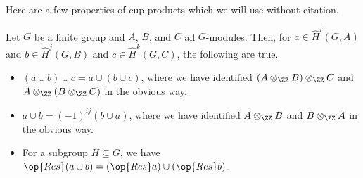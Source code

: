 Here are a few properties of cup products which we will use without citation.
\begin{proposition}
	Let $G$ be a finite group and $A$, $B$, and $C$ all $G$-modules. Then, for $a\in\widehat H^i(G,A)$ and $b\in\widehat H^j(G,B)$ and $c\in\widehat H^k(G,C)$, the following are true.
	\begin{itemize}
		\item $(a\cup b)\cup c=a\cup(b\cup c)$, where we have identified $(A\otimes_\ZZ B)\otimes_\ZZ C$ and $A\otimes_\ZZ(B\otimes_\ZZ C)$ in the obvious way.
		\item $a\cup b=(-1)^{ij}(b\cup a)$, where we have identified $A\otimes_\ZZ B$ and $B\otimes_\ZZ A$ in the obvious way.
		\item For a subgroup $H\subseteq G$, we have $\op{Res}(a\cup b)=(\op{Res}a)\cup(\op{Res}b)$.
	\end{itemize}
\end{proposition}

